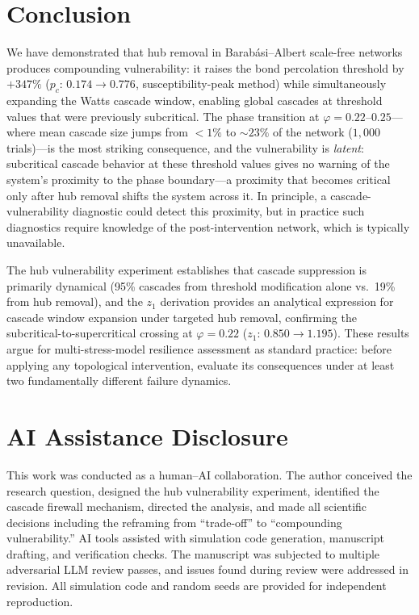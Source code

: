 \documentclass[aps,pre,twocolumn,superscriptaddress,showpacs]{revtex4-2}
\newcommand{\pc}{p_c}
\begin{document}
\section{Conclusion}
\label{sec:conclusion}

We have demonstrated that hub removal in Barab\'asi--Albert scale-free networks produces compounding vulnerability: it raises the bond percolation threshold by $+347\%$ ($\pc$: $0.174 \to 0.776$, susceptibility-peak method) while simultaneously expanding the Watts cascade window, enabling global cascades at threshold values that were previously subcritical. The phase transition at $\varphi=0.22$--$0.25$---where mean cascade size jumps from $<1\%$ to ${\sim}23\%$ of the network ($1{,}000$ trials)---is the most striking consequence, and the vulnerability is \emph{latent}: subcritical cascade behavior at these threshold values gives no warning of the system's proximity to the phase boundary---a proximity that becomes critical only after hub removal shifts the system across it. In principle, a cascade-vulnerability diagnostic could detect this proximity, but in practice such diagnostics require knowledge of the post-intervention network, which is typically unavailable.

The hub vulnerability experiment establishes that cascade suppression is primarily dynamical (95\% cascades from threshold modification alone vs.\ 19\% from hub removal), and the $z_1$ derivation provides an analytical expression for cascade window expansion under targeted hub removal, confirming the subcritical-to-supercritical crossing at $\varphi=0.22$ ($z_1$: $0.850 \to 1.195$). These results argue for multi-stress-model resilience assessment as standard practice: before applying any topological intervention, evaluate its consequences under at least two fundamentally different failure dynamics.

\section*{AI Assistance Disclosure}

This work was conducted as a human--AI collaboration. The author conceived the research question, designed the hub vulnerability experiment, identified the cascade firewall mechanism, directed the analysis, and made all scientific decisions including the reframing from ``trade-off'' to ``compounding vulnerability.'' AI tools assisted with simulation code generation, manuscript drafting, and verification checks. The manuscript was subjected to multiple adversarial LLM review passes, and issues found during review were addressed in revision. All simulation code and random seeds are provided for independent reproduction.
\end{document}
